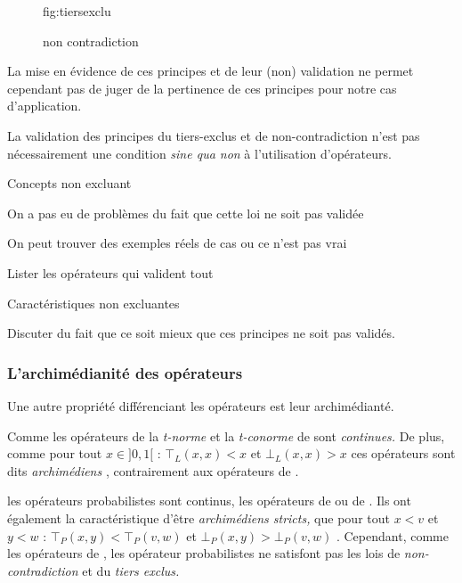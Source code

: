 \begin{figure}
  \centering
  
  \caption{fig:tiersexclu}
  \label{fig:tiers-exclu}
\end{figure}

\begin{figure}
  \centering
  
  \caption{non contradiction}
  \label{fig:non-contradiction}
\end{figure}

La mise en évidence de ces principes et de leur (non) validation ne
permet cependant pas de juger de la pertinence de ces principes pour
notre cas d’application.


La validation des principes du tiers-exclus et de non-contradiction
n'est pas nécessairement une condition \emph{sine qua non} à
l'utilisation d'opérateurs. 



Concepts non excluant

On a pas eu de problèmes du fait que cette loi ne soit pas validée

On peut trouver des exemples réels de cas ou ce n'est pas vrai

Lister les opérateurs qui valident tout

Caractéristiques non excluantes

Discuter du fait que ce soit mieux que ces principes ne soit pas
validés.

\subsubsection{L'archimédianité des opérateurs}

Une autre propriété différenciant les opérateurs est leur
archimédianté.

Comme les opérateurs de \textcite{Zadeh1965} la \emph{t-norme} et la
\emph{t-conorme} de  sont \emph{continues.} De plus,
comme pour tout \(x \in ]0,1[\) : \(⊤_L(x,x) < x\) et
\( ⊥_L(x,x) > x\) ces opérateurs sont dits \emph{archimédiens}
\autocite{Bouchon-Meunier1995}, contrairement aux opérateurs de
\textcite{Zadeh1965}.


les opérateurs probabilistes
sont continus, les opérateurs de \textcite{Zadeh1965} ou de
. Ils ont également la caractéristique d'être
\emph{archimédiens stricts,} \ie que pour tout \(x < v\) et \(y < w\)
: \(⊤_P(x,y) < ⊤_P(v,w)\) et \(⊥_P(x,y) > ⊥_P(v,w)\)
\autocite{Bouchon-Meunier1995}. Cependant, comme les opérateurs de
\textcite{Zadeh1965}, les opérateur probabilistes ne satisfont pas les
lois de \emph{non-contradiction} et du \emph{tiers exclus.}





